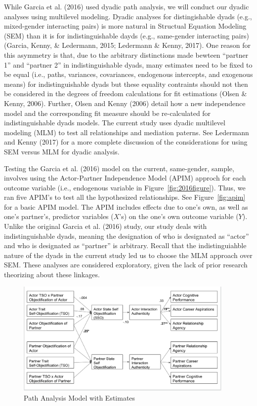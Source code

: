 \documentclass[man]{apa6}
\begin{document}
While Garcia et al. (2016) used dyadic path analysis, we will conduct
our dyadic analyses using multilevel modeling. Dyadic analyses for
distingishable dyads (e.g., mixed-gender interacting pairs) is more
natural in Structual Equation Modeling (SEM) than it is for
indistinguishable dayds (e.g., same-gender interacting pairs) (Garcia,
Kenny, \& Ledermann, 2015; Ledermann \& Kenny, 2017). One reason for
this asymmetry is that, due to the arbitrary distinctions made bewteen
\enquote{partner 1} and \enquote{partner 2} in indistinguishable dyads,
many estimates need to be fixed to be equal (i.e., paths, variances,
covariances, endogenous intercepts, and exogenous means) for
indistinguishable dyads but these equality contraints should not then be
considered in the degrees of freedom calculations for fit estimations
(Olsen \& Kenny, 2006). Further, Olsen and Kenny (2006) detail how a new
independence model and the corresponding fit measure should be
re-calculated for indistinguishable dyads models. The current study uses
dyadic multilevel modeling (MLM) to test all relationships and mediation
paterns. See Ledermann and Kenny (2017) for a more complete discussion
of the considerations for using SEM versus MLM for dyadic analysis.

Testing the Garcia et al. (2016) model on the current, same-gender,
sample, involves using the Actor-Partner Independence Model (APIM)
approch for each outcome variable (i.e., endogenous variable in
Figure~\ref{fig:2016figure}). Thus, we ran five APIM's to test all the
hypothesized relationships. See Figure~\ref{fig:apim} for a basic APIM
model. The APIM includes effects due to one's own, as well as one's
partner's, predictor variables (\(X\)'s) on the one's own outcome
variable (\(Y\)). Unlike the original Garcia et al. (2016) study, our
study deals with indistinguishable dyads, meaning the designation of who
is designated as \enquote{actor} and who is designated as
\enquote{partner} is arbitrary. Recall that the indistinguiahble nature
of the dyads in the current study led us to choose the MLM approach over
SEM. These analyses are considered exploratory, given the lack of prior
research theorizing about these linkages.

\begin{figure}
\includegraphics[width=400px]{SEMfigure} \caption{Path Analysis Model with Estimates}\label{fig:semfigure}
\end{figure}
\end{document}

